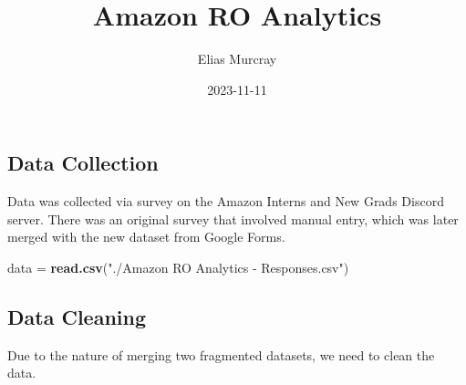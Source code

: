 \documentclass[
]{article}
\title{Amazon RO Analytics}
\author{Elias Murcray}
\date{2023-11-11}
\newenvironment{Shaded}{\begin{snugshade}}{\end{snugshade}}
\newcommand{\CommentTok}[1]{\textcolor[rgb]{0.56,0.35,0.01}{\textit{#1}}}
\newcommand{\FunctionTok}[1]{\textcolor[rgb]{0.13,0.29,0.53}{\textbf{#1}}}
\newcommand{\NormalTok}[1]{#1}
\newcommand{\OtherTok}[1]{\textcolor[rgb]{0.56,0.35,0.01}{#1}}
\newcommand{\SpecialCharTok}[1]{\textcolor[rgb]{0.81,0.36,0.00}{\textbf{#1}}}
\newcommand{\StringTok}[1]{\textcolor[rgb]{0.31,0.60,0.02}{#1}}
\begin{document}
\maketitle

\hypertarget{data-collection}{%
\subsection{Data Collection}\label{data-collection}}

Data was collected via survey on the Amazon Interns and New Grads
Discord server. There was an original survey that involved manual entry,
which was later merged with the new dataset from Google Forms.

\begin{Shaded}
\begin{Highlighting}[]
\NormalTok{data }\OtherTok{=} \FunctionTok{read.csv}\NormalTok{(}\StringTok{"./Amazon RO Analytics {-} Responses.csv"}\NormalTok{)}
\end{Highlighting}
\end{Shaded}

\hypertarget{data-cleaning}{%
\subsection{Data Cleaning}\label{data-cleaning}}

Due to the nature of merging two fragmented datasets, we need to clean
the data.

\begin{Shaded}
\end{Shaded}
\end{document}
